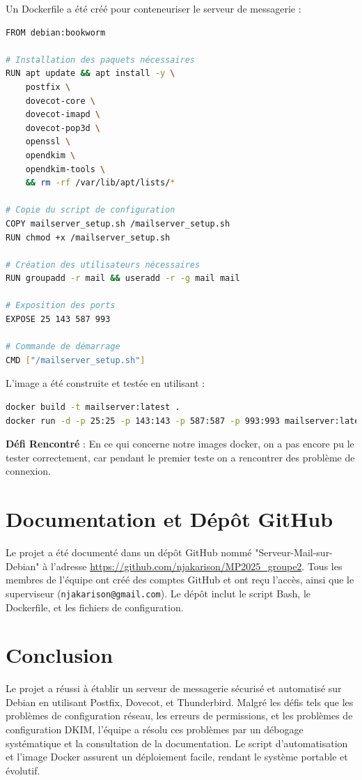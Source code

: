 \documentclass[a4paper,12pt]{article}
\begin{document}
Un Dockerfile a été créé pour conteneuriser le serveur de messagerie :

\begin{lstlisting}[language=bash]
FROM debian:bookworm

# Installation des paquets nécessaires
RUN apt update && apt install -y \
    postfix \
    dovecot-core \
    dovecot-imapd \
    dovecot-pop3d \
    openssl \
    opendkim \
    opendkim-tools \
    && rm -rf /var/lib/apt/lists/*

# Copie du script de configuration
COPY mailserver_setup.sh /mailserver_setup.sh
RUN chmod +x /mailserver_setup.sh

# Création des utilisateurs nécessaires
RUN groupadd -r mail && useradd -r -g mail mail

# Exposition des ports
EXPOSE 25 143 587 993

# Commande de démarrage
CMD ["/mailserver_setup.sh"]
\end{lstlisting}

L'image a été construite et testée en utilisant :
\begin{lstlisting}[language=bash]
docker build -t mailserver:latest .
docker run -d -p 25:25 -p 143:143 -p 587:587 -p 993:993 mailserver:latest
\end{lstlisting}

\textbf{Défi Rencontré} : En ce qui concerne notre images docker, on a pas encore pu le tester correctement, car pendant le premier teste on a rencontrer des problème de connexion.

\section{Documentation et Dépôt GitHub}

Le projet a été documenté dans un dépôt GitHub nommé "Serveur-Mail-sur-Debian" à l'adresse \url{https://github.com/njakarison/MP2025_groupe2}. Tous les membres de l'équipe ont créé des comptes GitHub et ont reçu l'accès, ainsi que le superviseur (\texttt{njakarison@gmail.com}). Le dépôt inclut le script Bash, le Dockerfile, et les fichiers de configuration.

\section{Conclusion}

Le projet a réussi à établir un serveur de messagerie sécurisé et automatisé sur Debian en utilisant Postfix, Dovecot, et Thunderbird. Malgré les défis tels que les problèmes de configuration réseau, les erreurs de permissions, et les problèmes de configuration DKIM, l'équipe a résolu ces problèmes par un débogage systématique et la consultation de la documentation. Le script d'automatisation et l'image Docker assurent un déploiement facile, rendant le système portable et évolutif.
\end{document}
